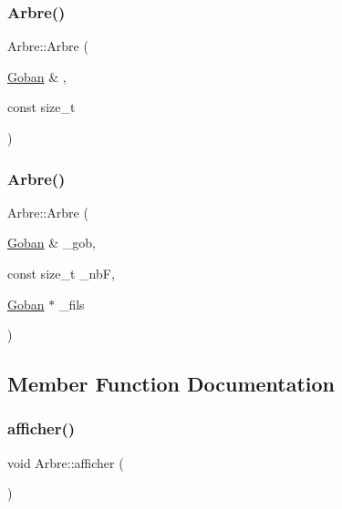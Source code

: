 \mbox{\label{class_arbre_acaa1b2ef290ae35e414d6fc5510c9e6e}} 
\subsubsection{\texorpdfstring{Arbre()}{Arbre()}\hspace{0.1cm}{\footnotesize\ttfamily [4/5]}}
{\footnotesize\ttfamily Arbre\+::\+Arbre (\begin{DoxyParamCaption}\item[{\hyperlink{class_goban}{Goban} \&}]{,  }\item[{const size\+\_\+t}]{ }\end{DoxyParamCaption})}

\mbox{\label{class_arbre_a7be58ac146487307f93a5c141f3546df}} 
\subsubsection{\texorpdfstring{Arbre()}{Arbre()}\hspace{0.1cm}{\footnotesize\ttfamily [5/5]}}
{\footnotesize\ttfamily Arbre\+::\+Arbre (\begin{DoxyParamCaption}\item[{\hyperlink{class_goban}{Goban} \&}]{\+\_\+gob,  }\item[{const size\+\_\+t}]{\+\_\+nbF,  }\item[{\hyperlink{class_goban}{Goban} $\ast$}]{\+\_\+fils }\end{DoxyParamCaption})}



\subsection{Member Function Documentation}
\mbox{\label{class_arbre_a970de955ffdbbd5894e0fa0c40c4e69e}} 
\subsubsection{\texorpdfstring{afficher()}{afficher()}}
{\footnotesize\ttfamily void Arbre\+::afficher (\begin{DoxyParamCaption}{ }\end{DoxyParamCaption})}

